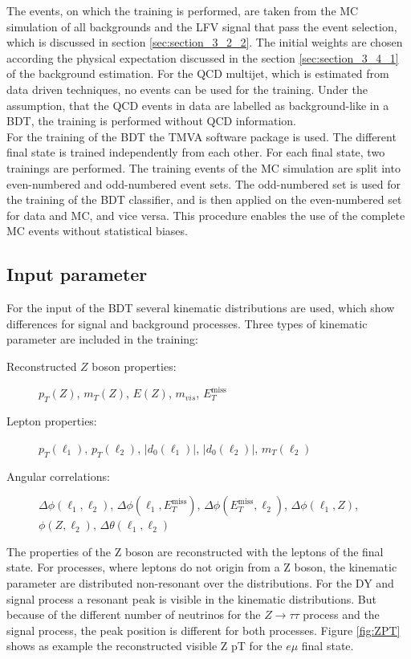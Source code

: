 The events, on which the training is performed, are taken from the \gls{MC} simulation of all backgrounds and the \gls{LFV} signal that pass the event selection, which is discussed in section \ref{sec:section_3_2_2}. The initial weights are chosen according the physical expectation discussed in the section \ref{sec:section_3_4_1} of the background estimation. For the \gls{QCD} multijet, which is estimated from data driven techniques, no events can be used for the training. Under the assumption, that the \gls{QCD} events in data are labelled as background-like in a \gls{BDT},  the training is performed without \gls{QCD} information. \\

For the training of the \gls{BDT} the TMVA software package \cite{TMVA} is used. The different final state is trained independently from each other. For each final state, two trainings are performed. The training events of the \gls{MC} simulation are split into even-numbered and odd-numbered event sets. The odd-numbered set is used for the training of the \gls{BDT} classifier, and is then applied on the even-numbered set for data and \gls{MC}, and vice versa. This procedure enables the use of the complete \gls{MC} events without statistical biases. 


\subsection{Input parameter}

For the input of the \gls{BDT} several kinematic distributions are used, which show differences for signal and background processes. Three types of kinematic parameter are included in the training:

\begin{description}
	\item [Reconstructed $Z$ boson properties:] $p_T(Z)$, $m_T(Z)$, $E(Z)$, $m_{vis}$, ${E}_{T}^{\text{miss}}$
	\item [Lepton properties:] $p_T(\ell_1)$,  $p_T(\ell_2)$, $|d_0(\ell_1)|$, $|d_0(\ell_2)|$, $m_T(\ell_2)$
	\item [Angular correlations:] $\Delta \phi(\ell_1, \ell_2)$, $\Delta \phi(\ell_1, {E}_{T}^{\text{miss}})$, $\Delta \phi({E}_{T}^{\text{miss}}, \ell_2)$, $\Delta \phi(\ell_1, Z)$, $\phi(Z, \ell_2)$, $\Delta \theta(\ell_1, \ell_2)$
\end{description}

The properties of the Z boson are reconstructed with the leptons of the final state. For processes, where leptons do not origin from a Z boson, the kinematic parameter are distributed non-resonant over the distributions. For the \gls{DY} and signal process a resonant peak is visible in the kinematic distributions. But because of the different number of neutrinos for the $Z\to\tau\tau$ process and the signal process, the peak position is different for both processes. Figure \ref{fig:ZPT} shows as example the reconstructed visible Z \gls{pT} for the $e\mu$ final state. \\


